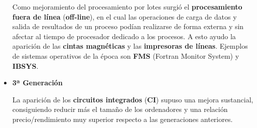 \begin{itemize}
    Como mejoramiento del procesamiento por lotes surgió el \textbf{procesamiento fuera de línea} (\textbf{off-line}), en el cual las operaciones de carga de datos y salida de resultados de un proceso podían realizarse de forma externa y sin afectar al tiempo de procesador dedicado a los procesos. A esto ayudo la aparición de las \textbf{cintas magnéticas} y las \textbf{impresoras de líneas}. Ejemplos de sistemas operativos de la época son \textbf{FMS} (Fortran Monitor System) y \textbf{IBSYS}.

    \item \textbf{3ª Generación}

    La aparición de los \textbf{circuitos integrados} (\textbf{CI}) supuso una mejora sustancial, consiguiendo reducir más el tamaño de los ordenadores y una relación precio/rendimiento muy superior respecto a las generaciones anteriores.
\end{itemize}




\glsaddall
\printglossaries


\newpage
{}



